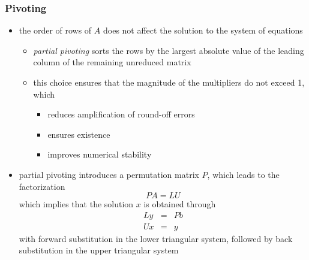 \begin{frame}[fragile]
%
  \frametitle{Pivoting}
%
  \begin{itemize}
%
  \item the order of rows of $A$ does not affect the solution to the system of equations
    \begin{itemize}
    \item {\em partial pivoting} sorts the rows by the largest absolute value of the leading
      column of the remaining unreduced matrix
    \item this choice ensures that the magnitude of the multipliers do not exceed 1, which
      \begin{itemize}
      \item reduces amplification of round-off errors
      \item ensures existence
      \item improves numerical stability
      \end{itemize}
    \end{itemize}
%
  \item partial pivoting introduces a permutation matrix $P$, which leads to the factorization
    \begin{equation}
      P A = L U
    \end{equation}
    which implies that the solution $x$ is obtained through
    \begin{eqnarray}
      L y & = & P b \\
      U x & = & y
    \end{eqnarray}
    with forward substitution in the lower triangular system, followed by back substitution in
    the upper triangular system
%
  \end{itemize}
%
\end{frame}

